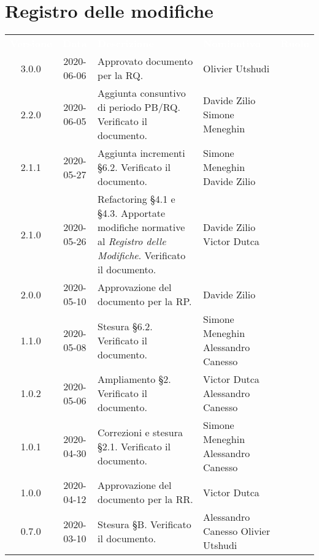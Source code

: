 \section*{Registro delle modifiche}
{
	\centering
	\begin{longtable}{ c c  C{4cm}  C{4cm}  C{3cm} }
		\textcolor{white}{\textbf{Versione}} & \textcolor{white}{\textbf{Data}} & \textcolor{white}{\textbf{Descrizione}} & \textcolor{white}{\textbf{Nominativo}} & \textcolor{white}{\textbf{Ruolo}}\\	
		3.0.0 & 2020-06-06 & Approvato documento per la RQ. & Olivier Utshudi & \RdP{} \\
		2.2.0 & 2020-06-05 & Aggiunta consuntivo di periodo PB/RQ. Verificato il documento. & Davide Zilio \newline Simone Meneghin & \Res{} \newline \ver{} \\	
		2.1.1 & 2020-05-27 & Aggiunta incrementi \S 6.2. Verificato il documento. & Simone Meneghin \newline Davide Zilio &\adm{} \newline \ver{} \\
		2.1.0 & 2020-05-26 & Refactoring \S 4.1 e \S 4.3. Apportate modifiche normative al \textit{Registro delle Modifiche}. Verificato il documento. & Davide Zilio \newline Victor Dutca & \adm{} \newline \ver{} \\
		2.0.0 & 2020-05-10 & Approvazione del documento per la RP. & Davide Zilio &\RdP{} \\
		1.1.0 & 2020-05-08 & Stesura \S 6.2. Verificato il documento. & Simone Meneghin \newline Alessandro Canesso &\adm{} \newline \ver{}\\
		1.0.2 & 2020-05-06 & Ampliamento \S 2. Verificato il documento. & Victor Dutca \newline Alessandro Canesso &\Res{} \newline \ver{}\\
		1.0.1 & 2020-04-30 & Correzioni e stesura \S 2.1. Verificato il documento. & Simone Meneghin \newline Alessandro Canesso &\Res{} \newline \ver{}\\
		1.0.0 & 2020-04-12 & Approvazione del documento per la RR. & Victor Dutca &\RdP{} \\
		0.7.0 & 2020-03-10 & Stesura \S B. Verificato il documento. & Alessandro Canesso \newline Olivier Utshudi &\Res{} \newline \ver{}\\

\end{longtable}}
